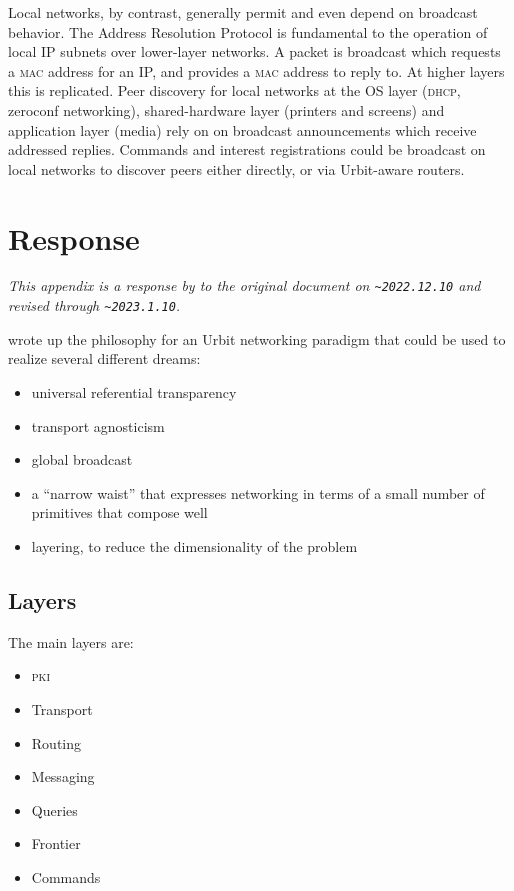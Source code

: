 \documentclass[twoside]{article}
\begin{document}
Local networks, by contrast, generally permit and even depend on broadcast behavior. The Address Resolution Protocol is fundamental to the operation of local IP subnets over lower-layer networks. A packet is broadcast which requests a \textsc{mac} address for an IP, and provides a \textsc{mac} address to reply to. At higher layers this is replicated. Peer discovery for local networks at the OS layer (\textsc{dhcp}, zeroconf networking), shared-hardware layer (printers and screens) and application layer (media) rely on on broadcast announcements which receive addressed replies. Commands and interest registrations could be broadcast on local networks to discover peers either directly, or via Urbit-aware routers.

\section{Response}

\noindent\sloppy
\emph{This appendix is a response by  to the original document on \texttt{\textasciitilde 2022.12.10} and revised through \texttt{\textasciitilde 2023.1.10}.}

 wrote up the philosophy for an Urbit networking paradigm that could be used to realize several different dreams:

\begin{itemize}
  \item  universal referential transparency
  \item  transport agnosticism
  \item  global broadcast
  \item  a ``narrow waist'' that expresses networking in terms of a small number of primitives that compose well
  \item  layering, to reduce the dimensionality of the problem
\end{itemize}

\subsection{Layers}

The main layers are:

\begin{itemize}
  \item  \textsc{pki}
  \item  Transport
  \item  Routing
  \item  Messaging
  \item  Queries
  \item  Frontier
  \item  Commands
\end{itemize}
\end{document}

